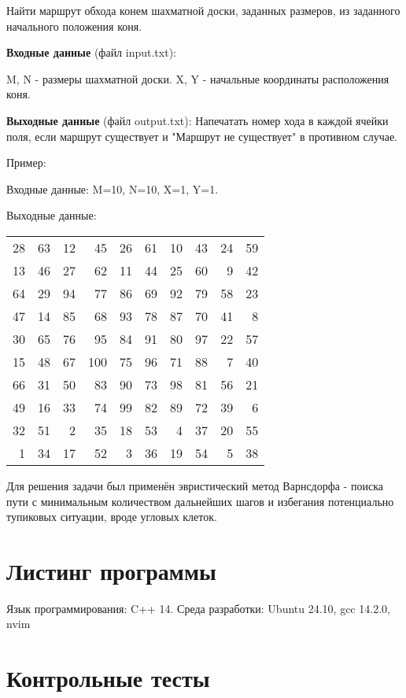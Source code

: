 \documentclass[a4paper,12pt]{article}
\begin{document}
	Найти маршрут обхода конем шахматной доски, заданных размеров, из заданного начального положения коня.
	
	\textbf{Входные данные} (файл input.txt):
	
	M, N - размеры шахматной доски.
	X, Y - начальные координаты расположения коня.
	
	\textbf{Выходные данные} (файл output.txt): Напечатать номер хода в каждой ячейки поля, если маршрут существует и "Маршрут не существует" в противном случае.
	
	Пример:
	
	Входные данные: M=10, N=10, X=1, Y=1.
	
	Выходные данные:

	\begin{tabular}{*{10}{r}}
		28 & 63 & 12 & 45 & 26 & 61 & 10 & 43 & 24 & 59 \\
		13 & 46 & 27 & 62 & 11 & 44 & 25 & 60 & 9 & 42 \\
		64 & 29 & 94 & 77 & 86 & 69 & 92 & 79 & 58 & 23 \\
		47 & 14 & 85 & 68 & 93 & 78 & 87 & 70 & 41 & 8 \\
		30 & 65 & 76 & 95 & 84 & 91 & 80 & 97 & 22 & 57 \\
		15 & 48 & 67 & 100 & 75 & 96 & 71 & 88 & 7 & 40 \\
		66 & 31 & 50 & 83 & 90 & 73 & 98 & 81 & 56 & 21 \\
		49 & 16 & 33 & 74 & 99 & 82 & 89 & 72 & 39 & 6 \\
		32 & 51 & 2 & 35 & 18 & 53 & 4 & 37 & 20 & 55 \\
		1 & 34 & 17 & 52 & 3 & 36 & 19 & 54 & 5 & 38 \\
	\end{tabular}
	
	Для решения задачи был применён эвристический метод Варнсдорфа - поиска пути с минимальным количеством дальнейших шагов и избегания потенциально тупиковых ситуации, вроде угловых клеток.
	
	\newpage
	\section{Листинг программы}
	Язык программирования: C++ 14. Среда разработки: Ubuntu 24.10, gcc 14.2.0, nvim
	
	
	\newpage
	\section{Контрольные тесты}
	
\end{document}
